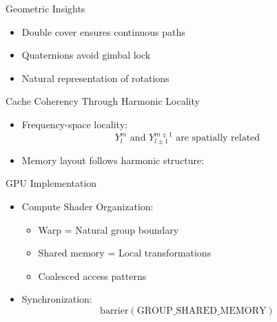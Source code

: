 \documentclass{beamer}
\begin{document}
\begin{frame}{Geometric Insights}
\begin{center}
\end{center}
\begin{itemize}
\item Double cover ensures continuous paths
\item Quaternions avoid gimbal lock
\item Natural representation of rotations
\end{itemize}
\end{frame}
\begin{frame}{Cache Coherency Through Harmonic Locality}
\begin{itemize}
\item Frequency-space locality:
\begin{equation*}
Y_l^m \text{ and } Y_{l\pm1}^{m\pm1} \text{ are spatially related}
\end{equation*}
\item Memory layout follows harmonic structure:
\begin{center}
\end{center}
\end{itemize}
\end{frame}
\begin{frame}{GPU Implementation}
\begin{itemize}
\item Compute Shader Organization:
\begin{itemize}
\item Warp = Natural group boundary
\item Shared memory = Local transformations
\item Coalesced access patterns
\end{itemize}
\pause
\item Synchronization:
\begin{equation*}
\text{barrier}(\text{GROUP_SHARED_MEMORY})
\end{equation*}
\end{itemize}
\end{frame}
\end{document}
